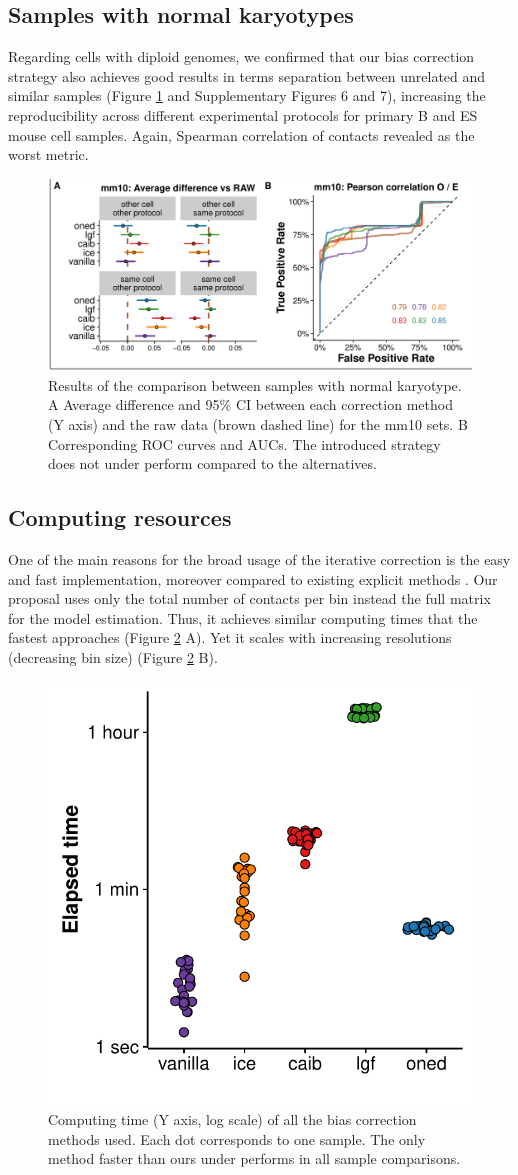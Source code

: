 \documentclass{bioinfo}
\begin{document}
\subsection{Samples with normal karyotypes}

Regarding cells with diploid genomes, we confirmed that our bias
correction strategy also achieves good results in terms separation between
unrelated and similar samples (Figure \ref{fig:normal} and Supplementary
Figures 6 and 7), increasing the reproducibility across different
experimental protocols for primary B and ES mouse cell samples. Again,
Spearman correlation of contacts revealed as the worst metric.

\begin{figure}
	\centerline{\includegraphics[width=.50\textwidth]{img/correlation_normal_figure4.pdf}}
	\caption{
		Results of the comparison between samples with normal karyotype. A Average difference and 95\% CI between each correction method (Y axis) and the raw data (brown dashed line) for the mm10 sets. B Corresponding ROC curves and AUCs. The introduced strategy does not under perform compared to the alternatives.
	}\label{fig:normal}
\end{figure}

\subsection{Computing resources}

One of the main reasons for the broad usage of the iterative correction \citep{imakaev2012iterative} is the easy and fast implementation, moreover compared to existing explicit methods \citep{servant2012hitc}. Our proposal uses only the total number of contacts per bin instead the full matrix for the model estimation. Thus, it achieves similar computing times that the fastest approaches (Figure \ref{fig:times} A). Yet it scales with increasing resolutions (decreasing bin size) (Figure \ref{fig:times} B).

\begin{figure}
	\centerline{\includegraphics[width=.35\textwidth]{img/times_sina_figure5.pdf}}
	\caption{
		Computing time (Y axis, log scale) of all the bias correction methods used. Each dot corresponds to one sample. The only method faster than ours under performs in all sample comparisons.
	}\label{fig:times}
\end{figure}
\end{document}
